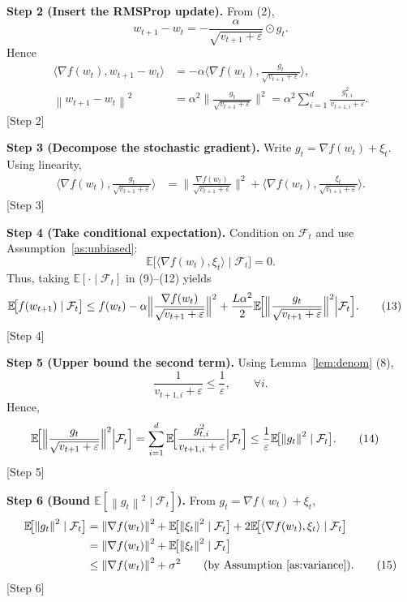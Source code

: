 \documentclass{article}
\newcommand{\EE}{\mathbb{E}}
\newcommand{\norm}[1]{\left\lVert#1\right\rVert}
\begin{document}
\noindent\textbf{Step 2 (Insert the RMSProp update).}  
From (2),
\[
w_{t+1}-w_{t}= -\frac{\alpha}{\sqrt{v_{t+1}+\varepsilon}}\odot g_{t}.
\]
Hence
\begin{align}
\langle\nabla f(w_{t}),w_{t+1}-w_{t}\rangle
&= -\alpha\Big\langle\nabla f(w_{t}),\frac{g_{t}}{\sqrt{v_{t+1}+\varepsilon}}\Big\rangle, \tag{10}\\
\norm{w_{t+1}-w_{t}}^{2}
&= \alpha^{2}\Big\|\frac{g_{t}}{\sqrt{v_{t+1}+\varepsilon}}\Big\|^{2}
   =\alpha^{2}\sum_{i=1}^{d}\frac{g_{t,i}^{2}}{v_{t+1,i}+\varepsilon}. \tag{11}
\end{align}
[Step 2]

\noindent\textbf{Step 3 (Decompose the stochastic gradient).}  
Write $g_{t}= \nabla f(w_{t})+\xi_{t}$. Using linearity,
\begin{align}
\langle\nabla f(w_{t}),\frac{g_{t}}{\sqrt{v_{t+1}+\varepsilon}}\rangle
&= \Big\|\frac{\nabla f(w_{t})}{\sqrt{v_{t+1}+\varepsilon}}\Big\|^{2}
   +\Big\langle\nabla f(w_{t}),\frac{\xi_{t}}{\sqrt{v_{t+1}+\varepsilon}}\Big\rangle. \tag{12}
\end{align}
[Step 3]

\noindent\textbf{Step 4 (Take conditional expectation).}  
Condition on $\mathcal{F}_{t}$ and use Assumption~\ref{as:unbiased}:
\[
\EE\bigl[\langle\nabla f(w_{t}),\xi_{t}\rangle\mid\mathcal{F}_{t}\bigr]=0.
\]
Thus, taking $\EE[\cdot\mid\mathcal{F}_{t}]$ in (9)–(12) yields
\begin{align}
\EE\!\bigl[f(w_{t+1})\mid\mathcal{F}_{t}\bigr]
&\le f(w_{t})
   -\alpha\Big\|\frac{\nabla f(w_{t})}{\sqrt{v_{t+1}+\varepsilon}}\Big\|^{2}
   +\frac{L\alpha^{2}}{2}\EE\!\Bigl[\Big\|\frac{g_{t}}{\sqrt{v_{t+1}+\varepsilon}}\Big\|^{2}\Big|\mathcal{F}_{t}\Bigr]. \tag{13}
\end{align}
[Step 4]

\noindent\textbf{Step 5 (Upper bound the second term).}  
Using Lemma~\ref{lem:denom} (8),
\[
\frac{1}{v_{t+1,i}+\varepsilon}\le\frac{1}{\varepsilon},\qquad\forall i.
\]
Hence,
\begin{align}
\EE\!\Bigl[\Big\|\frac{g_{t}}{\sqrt{v_{t+1}+\varepsilon}}\Big\|^{2}\Big|\mathcal{F}_{t}\Bigr]
&= \sum_{i=1}^{d}\EE\!\Bigl[\frac{g_{t,i}^{2}}{v_{t+1,i}+\varepsilon}\Big|\mathcal{F}_{t}\Bigr]
 \le \frac{1}{\varepsilon}\EE\!\bigl[\norm{g_{t}}^{2}\mid\mathcal{F}_{t}\bigr]. \tag{14}
\end{align}
[Step 5]

\noindent\textbf{Step 6 (Bound $\EE[\norm{g_{t}}^{2}\mid\mathcal{F}_{t}]$).}  
From $g_{t}= \nabla f(w_{t})+\xi_{t}$,
\begin{align}
\EE\!\bigl[\norm{g_{t}}^{2}\mid\mathcal{F}_{t}\bigr]
&= \norm{\nabla f(w_{t})}^{2}
   +\EE\!\bigl[\norm{\xi_{t}}^{2}\mid\mathcal{F}_{t}\bigr]
   +2\EE\!\bigl[\langle\nabla f(w_{t}),\xi_{t}\rangle\mid\mathcal{F}_{t}\bigr] \\
&= \norm{\nabla f(w_{t})}^{2} + \EE\!\bigl[\norm{\xi_{t}}^{2}\mid\mathcal{F}_{t}\bigr] \\
&\le \norm{\nabla f(w_{t})}^{2} + \sigma^{2} \qquad\text{(by Assumption~\ref{as:variance})}. \tag{15}
\end{align}
[Step 6]
\end{document}
